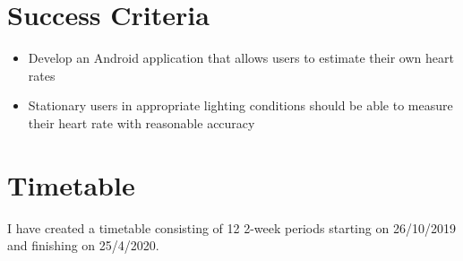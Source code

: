 \section*{Success Criteria}
\begin{itemize}
\item Develop an Android application that allows users to estimate their own heart rates
\item Stationary users in appropriate lighting conditions should be able to measure their heart rate with reasonable accuracy
\end{itemize}

\section*{Timetable}
I have created a timetable consisting of 12 2-week periods starting on 26/10/2019 and finishing on 25/4/2020.
